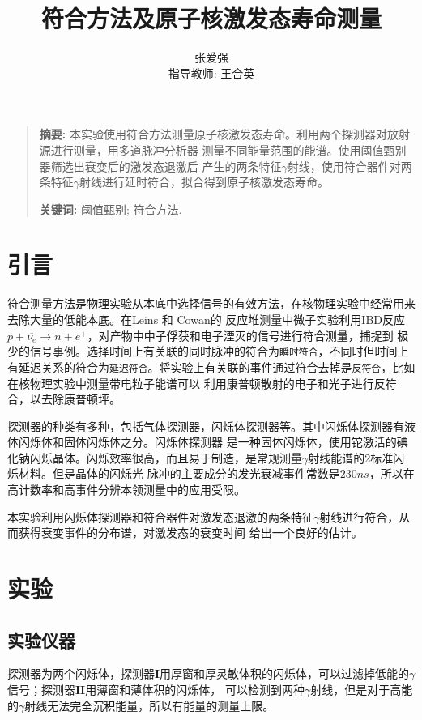\documentclass[12pt]{ctexart}
\title{符合方法及原子核激发态寿命测量}
\author{张爱强\\指导教师: 王合英}
\date{}
\newenvironment{sciabstract}{%
\begin{quote} \textbf{摘要: }}
{\end{quote}}
\begin{document}
\maketitle
\begin{sciabstract}
    本实验使用符合方法测量原子核激发态寿命。利用两个探测器对放射源进行测量，用多道脉冲分析器
    测量不同能量范围的能谱。使用阈值甄别器筛选出衰变后的激发态退激后
    产生的两条特征$\gamma$射线，使用符合器件对两条特征$\gamma$射线进行延时符合，拟合得到原子核激发态寿命。
    \par\textbf{关键词: } 阈值甄别; 符合方法.
\end{sciabstract}
\section{引言}
符合测量方法是物理实验从本底中选择信号的有效方法，在核物理实验中经常用来去除大量的低能本底。在Leins 和 Cowan的
反应堆测量中微子实验利用IBD反应$p+\overline{\nu_e}\to n+e^+$，对产物中中子俘获和电子湮灭的信号进行符合测量，捕捉到
极少的信号事例\cite{doi:10.1063/1.1770939}。选择时间上有关联的同时脉冲的符合为\texttt{瞬时符合}，不同时但时间上
有延迟关系的符合为\texttt{延迟符合}。将实验上有关联的事件通过符合去掉是\texttt{反符合}，比如在核物理实验中测量带电粒子能谱可以
利用康普顿散射的电子和光子进行反符合，以去除康普顿坪\cite{nuclear}。

探测器的种类有多种，包括气体探测器，闪烁体探测器等\cite{nuclear}。其中闪烁体探测器有液体闪烁体和固体闪烁体之分。闪烁体探测器
是一种固体闪烁体，使用铊激活的碘化钠闪烁晶体。闪烁效率很高，而且易于制造，是常规测量$\gamma$射线能谱的2标准闪烁材料。但是晶体的闪烁光
脉冲的主要成分的发光衰减事件常数是$230ns$，所以在高计数率和高事件分辨本领测量中的应用受限。

本实验利用闪烁体探测器和符合器件对激发态退激的两条特征$\gamma$射线进行符合，从而获得衰变事件的分布谱，对激发态的衰变时间
给出一个良好的估计。
\section{实验}
\subsection{实验仪器}
探测器为两个闪烁体，探测器$\mathbf{I}$用厚窗和厚灵敏体积的闪烁体，可以过滤掉低能的$\gamma$信号；探测器$\mathbf{II}$用薄窗和薄体积的闪烁体，
可以检测到两种$\gamma$射线，但是对于高能的$\gamma$射线无法完全沉积能量，所以有能量的测量上限。
\end{document}
